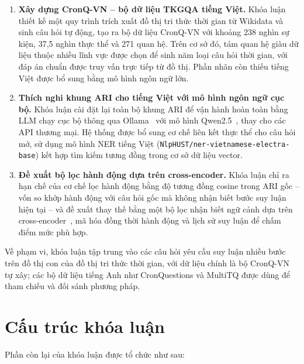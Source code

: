 \begin{enumerate}
  \item \textbf{Xây dựng CronQ-VN -- bộ dữ liệu TKGQA tiếng Việt.} Khóa luận thiết kế một quy
  trình trích xuất đồ thị tri thức thời gian từ Wikidata và sinh câu hỏi tự động, tạo ra bộ dữ
  liệu CronQ-VN với khoảng 238 nghìn sự kiện, 37,5 nghìn thực thể và 271 quan hệ. Trên cơ sở đó,
  tám quan hệ giàu dữ liệu thuộc nhiều lĩnh vực được chọn để sinh năm loại câu hỏi thời gian, với
  đáp án chuẩn được truy vấn trực tiếp từ đồ thị. Phần nhãn còn thiếu tiếng Việt được bổ sung bằng
  mô hình ngôn ngữ lớn.

  \item \textbf{Thích nghi khung ARI cho tiếng Việt với mô hình ngôn ngữ cục bộ.} Khóa luận cài
  đặt lại toàn bộ khung ARI để vận hành hoàn toàn bằng LLM chạy cục bộ thông qua
  Ollama~\cite{ollama} với mô hình Qwen2.5~\cite{qwen2025}, thay cho các API thương mại. Hệ thống
  được bổ sung cơ chế liên kết thực thể cho câu hỏi mở, sử dụng mô hình NER tiếng Việt
  (\texttt{NlpHUST/ner-vietnamese-electra-base}) kết hợp tìm kiếm tương đồng trong cơ sở dữ liệu
  vector.

  \item \textbf{Đề xuất bộ lọc hành động dựa trên cross-encoder.} Khóa luận chỉ ra hạn chế của cơ
  chế lọc hành động bằng độ tương đồng cosine trong ARI gốc -- vốn so khớp hành động với câu hỏi
  gốc mà không nhận biết bước suy luận hiện tại -- và đề xuất thay thế bằng một bộ lọc nhận biết
  ngữ cảnh dựa trên cross-encoder~\cite{reimers2019sbert}, mã hóa đồng thời hành động và lịch sử
  suy luận để chấm điểm mức phù hợp.
\end{enumerate}

Về phạm vi, khóa luận tập trung vào các câu hỏi yêu cầu suy luận nhiều bước trên đồ thị con của
đồ thị tri thức thời gian, với dữ liệu chính là bộ CronQ-VN tự xây; các bộ dữ liệu tiếng Anh như
CronQuestions và MultiTQ được dùng để tham chiếu và đối sánh phương pháp.

\section{Cấu trúc khóa luận}
\label{sec:structure}

Phần còn lại của khóa luận được tổ chức như sau:

